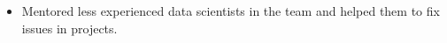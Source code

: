 \documentclass[11pt,a4paper,roman]{moderncv}
\makeatletter
\newcommand*{\customcventry}[7][.25em]{
  \begin{tabular}{@{}l} 
    {\bfseries #4}
  \end{tabular}
  \hfill%
  \begin{tabular}{l@{}}
     {\bfseries #5}
  \end{tabular} \\
  \begin{tabular}{@{}l} 
    {\itshape #3}
  \end{tabular}
  \hfill%
  \begin{tabular}{l@{}}
     {\itshape #2}
  \end{tabular}
  \ifx&#7&%
  \else{\\%
    \begin{minipage}{\maincolumnwidth}%
      \small#7%
    \end{minipage}}\fi%
  \par\addvspace{#1}}
\makeatother
\begin{document}
{{\begin{itemize}
\item Mentored less experienced data scientists in the team and helped them to fix issues in projects.
\end{itemize}
}


}
\end{document}
